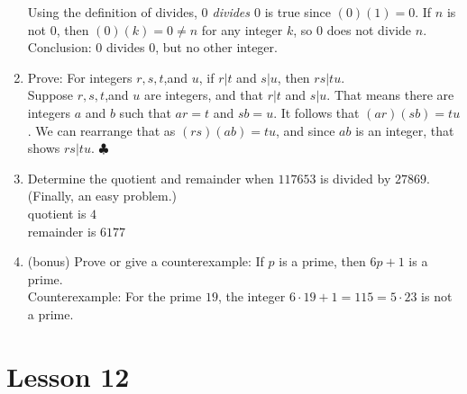 \documentclass[11pt]{amsart}
\begin{document}
\begin{enumerate}
{\color{blue}
Using the definition of divides,  {\it $0$ divides $0$} is true since $(0)(1) = 0$. If $n$ is not $0$, then $(0)(k)= 0\not= n$  for any integer $k$, so $0$ does not divide $n$. Conclusion: $0$ divides $0$, but no other integer.\\[5pt]
}


\item Prove: For integers $r,s,t$,and $u$, if $r|t$ and $s|u$, then $rs|tu$.\\[3pt]

{\color{blue} Suppose $r,s,t$,and $u$ are integers, and that $r|t$ and $s|u$. That means there are integers $a$ and $b$
such that $ar =t$ and $sb=u$. It follows that $(ar)(sb) = tu$. We can rearrange that as $(rs)(ab) = tu$, and since $ab$
is an integer, that shows $rs|tu$. $\clubsuit$\\[5pt]
}

\item Determine the quotient and remainder when $117653$ is
divided by $27869$. (Finally, an easy problem.)\\[3pt]

{\color{blue}
quotient is $4$\\
remainder is $6177$\\[5pt]
} 

\item (bonus) Prove or give a counterexample: If $p$ is a prime, then $6p+1$ is a prime.\\[3pt]

{\color{blue} Counterexample: For the prime $19$, the integer $6\cdot 19 + 1 = 115 = 5\cdot 23$ is not a prime.\\[5pt]
}
\end{enumerate}


\section{Lesson 12}
\end{document}
